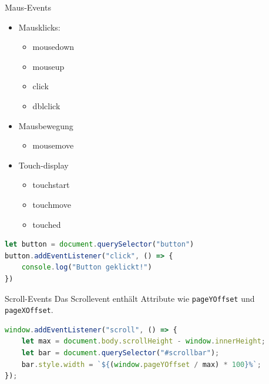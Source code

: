 \begin{definition}{Maus-Events}
  
  \begin{minipage}{0.45\linewidth}
  \begin{itemize}
  \item Mausklicks:
  \begin{itemize}
    \item mousedown
    \item mouseup
    \item click
    \item dblclick
  \end{itemize}
  \end{itemize}
  \end{minipage}
  \begin{minipage}{0.5\linewidth}
    \begin{itemize}
    \item Mausbewegung
    \begin{itemize}
      \item mousemove
    \end{itemize}
    \item Touch-display
    \begin{itemize}
      \item touchstart
      \item touchmove
      \item touched
    \end{itemize}
    \end{itemize}
    \end{minipage}

\begin{lstlisting}[language=JavaScript, style=basesmol]
let button = document.querySelector("button")
button.addEventListener("click", () => {
    console.log("Button geklickt!")
})
\end{lstlisting}
\end{definition}

\begin{definition}{Scroll-Events}
Das Scrollevent enthält Attribute wie \texttt{pageYOffset} und \texttt{pageXOffset}.
\begin{lstlisting}[language=JavaScript, style=basesmol]
window.addEventListener("scroll", () => {
    let max = document.body.scrollHeight - window.innerHeight;
    let bar = document.querySelector("#scrollbar");
    bar.style.width = `${(window.pageYOffset / max) * 100}%`;
});
\end{lstlisting}
\end{definition}

